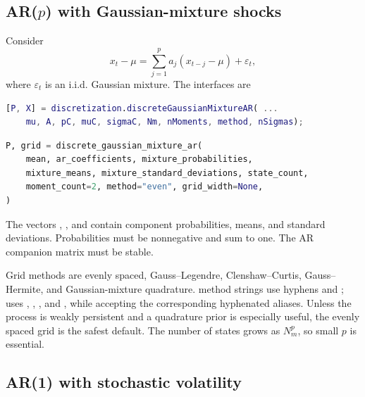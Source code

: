 \subsection[AR(p) with Gaussian-mixture shocks]{AR($p$) with Gaussian-mixture shocks}

Consider
\begin{equation}
  x_t-\mu=\sum_{j=1}^p a_j(x_{t-j}-\mu)+\varepsilon_t,
\end{equation}
where $\varepsilon_t$ is an i.i.d. Gaussian mixture. The interfaces are
\begin{lstlisting}[language=Matlab]
[P, X] = discretization.discreteGaussianMixtureAR( ...
    mu, A, pC, muC, sigmaC, Nm, nMoments, method, nSigmas);
\end{lstlisting}
\begin{lstlisting}[language=Python]
P, grid = discrete_gaussian_mixture_ar(
    mean, ar_coefficients, mixture_probabilities,
    mixture_means, mixture_standard_deviations, state_count,
    moment_count=2, method="even", grid_width=None,
)
\end{lstlisting}
The vectors , , and  contain component
probabilities, means, and standard deviations. Probabilities must be
nonnegative and sum to one. The AR companion matrix must be stable.

Grid methods are evenly spaced, Gauss--Legendre, Clenshaw--Curtis,
Gauss--Hermite, and Gaussian-mixture quadrature. \matlab{} method strings use
hyphens and ; \python{} uses
, ,
, and , while accepting the
corresponding hyphenated aliases. Unless the process is weakly persistent and
a quadrature prior is especially useful, the evenly spaced grid is the safest
default. The number of states grows as $N_m^p$, so small $p$ is essential.

\subsection{AR(1) with stochastic volatility}

